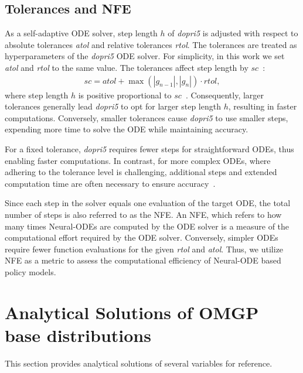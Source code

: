 \documentclass[sn-mathphys-num]{sn-jnl}
\begin{document}
\subsection{Tolerances and NFE}\label{section:nfe}
As a self-adaptive ODE solver, step length $h$ of \textit{dopri5} is adjusted with respect to absolute tolerances \textit{atol} and relative tolerances \textit{rtol}.
The tolerances are treated as hyperparameters of the \textit{dopri5} ODE solver.
For simplicity, in this work we set \textit{atol} and \textit{rtol} to the same value.
The tolerances affect step length by $sc$~\cite{hairer1993}:
\begin{align}
    sc=\textit{atol}+\max \left(\left|g_{n-1}\right|,\left|g_{n}\right|\right) \cdot \textit {rtol},
\end{align}
where step length $h$ is positive proportional to $sc$~\cite{hairer1993}. 
Consequently, larger tolerances generally lead \textit{dopri5} to opt for larger step length $h$, resulting in faster computations.
Conversely, smaller tolerances cause \textit{dopri5} to use smaller steps, expending more time to solve the ODE while maintaining accuracy.

For a fixed tolerance, \textit{dopri5} requires fewer steps for straightforward ODEs, thus enabling faster computations. In contrast, for more complex ODEs, where adhering to the tolerance level is challenging, additional steps and extended computation time are often necessary to ensure accuracy~\cite{grathwohl2019scalable}.

Since each step in the solver equals one evaluation of the target ODE, the total number of steps is also referred to as the NFE\cite{grathwohl2018ffjord}. 
An NFE, which refers to how many times Neural-ODEs are computed by the ODE solver is a measure of the computational effort required by the ODE solver.
Conversely, simpler ODEs require fewer function evaluations for the given \textit{rtol} and \textit{atol}.
Thus, we utilize NFE as a metric to assess the computational efficiency of Neural-ODE based policy models.


\section{Analytical Solutions of OMGP base distributions}\label{section:solutions}
This section provides analytical solutions of several variables for reference.
\end{document}
